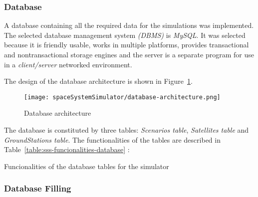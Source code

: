 \subsubsection{Database}

A database containing all the required data for the simulations was
implemented. The selected database management system \emph{(DBMS)} is
\emph{MySQL}. It was selected because it is friendly usable, works in multiple
platforms, provides transactional and nontransactional storage engines and the server is a separate program for use in a \emph{client/server} networked environment. 

The design of the database architecture is shown in Figure~\ref{fig:sss-database-architecture}.

\begin{figure}[!h]
\begin{center}
\texttt{[image: spaceSystemSimulator/database-architecture.png]}
\caption{Database architecture}
\label{fig:sss-database-architecture}
\end{center}
\end{figure}

The database is constituted by three tables: \emph{Scenarios table},
\emph{Satellites table} and \emph{GroundStations table}. The functionalities of the tables are described in
Table~\ref{table:sss-funcionalities-database} :

\begin{table}[hp]
  \centering
  {\small
  
  }
  \caption{Funcionalities of the database tables for the simulator}
  \label{table:sss-funcionalities-database}
\end{table}


\subsubsection{Database Filling}

